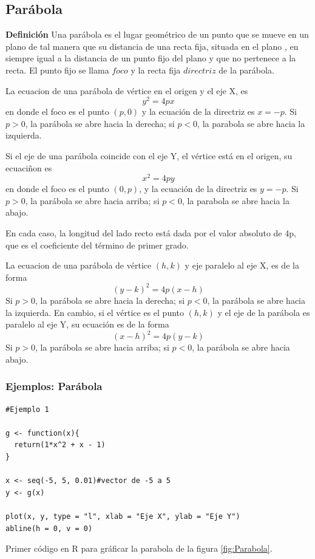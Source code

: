\documentclass[12pt,a4paper]{article} %
\begin{document}
\newpage

\subsection{Parábola} \label{subsec:parabola}
\citep{geometria}\textbf{Definición} Una parábola es el lugar geométrico de un punto que se mueve en un plano de tal manera que su distancia de una recta fija, situada en el plano , en siempre igual a la distancia de un punto fijo del plano y que no pertenece a la recta.
El punto fijo se llama $foco$ y la recta fija $directriz$ de la parábola.

La ecuacion de una parábola de vértice en el origen y el eje X, es 
$$y^2 = 4px$$
en donde el foco es el punto $(p,0)$ y la ecuación de la directriz es $x = -p$. Si $p > 0$, la parábola se abre hacia la derecha; si $p < 0$, la parabola se abre hacia la izquierda.

Si el eje de una parábola coincide con el eje Y, el vértice está en el origen, su ecuaciñon es 
$$x^2 = 4py$$
en donde el foco es el punto $(0,p)$, y la ecuación de la directriz es $y = -p$. Si $p > 0$, la parábola se abre hacia arriba; si $p < 0$, la parabola se abre hacia la abajo.

En cada caso, la longitud del lado recto está dada por el valor absoluto de 4p, que es el coeficiente del término de primer grado.

La ecuacion de una parábola de vértice $(h,k)$ y eje paralelo al eje X, es de la forma
$$(y - k)^2 = 4p(x - h)$$
Si $p > 0$, la parábola se abre hacia la derecha; si $p < 0$, la parábola se abre hacia la izquierda.
En cambio, si el vértice es el punto $(h,k)$ y el eje de la parábola es paralelo al eje Y, su ecuación es de la forma 
$$(x - h)^2 = 4p(y - k)$$
Si $p > 0$, la parábola se abre hacia arriba; si $p < 0$, la parábola se abre hacia abajo.

\subsubsection{Ejemplos: Parábola}

\begin{table}[htpb]
	\begin{lstlisting}
#Ejemplo 1

g <- function(x){
  return(1*x^2 + x - 1)
}

x <- seq(-5, 5, 0.01)#vector de -5 a 5
y <- g(x)

plot(x, y, type = "l", xlab = "Eje X", ylab = "Eje Y") 
abline(h = 0, v = 0)
	\end{lstlisting}
	\caption{Primer código en R para gráficar la parabola de la figura  \ref{fig:Parabola}.}
\label{alg:Parabola}	
\end{table}
\end{document}
